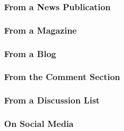 \documentclass{ltxdockit}
\begin{document}
\subsubsection{From a News Publication} %
\label{sub:from_a_news_publication}
\begin{refsection}
	\printbibliography[heading=none]
\end{refsection}
\subsubsection{From a Magazine} %
\label{sub:from_a_magazine}
\begin{refsection}
	\printbibliography[heading=none]
\end{refsection}
\subsubsection{From a Blog} %
\label{sub:from_a_blog}
\begin{refsection}
	\printbibliography[heading=none]
\end{refsection}
\subsubsection{From the Comment Section} %
\label{sub:from_the_comment_section}
\begin{refsection}
	\printbibliography[heading=none]
\end{refsection}
\subsubsection{From a Discussion List} %
\label{sub:from_a_discussion_list}
\begin{refsection}
	\printbibliography[heading=none]
\end{refsection}
\subsubsection{On Social Media} %
\label{sub:on_social_media}
\begin{refsection}
	\printbibliography[heading=none]
\end{refsection}
\end{document}
